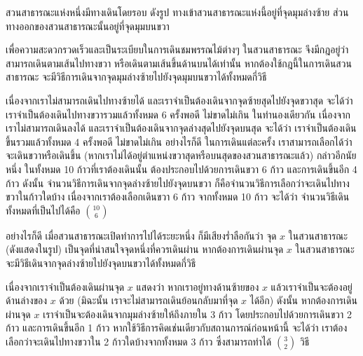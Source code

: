 \documentclass[a4paper,12pt,twoside]{article}
\begin{document}
\begin{example}
สวนสาธารณะแห่งหนึ่งมีทางเดินโดยรอบ ดังรูป \enskip ทางเข้าสวนสาธารณะแห่งนี้อยู่ที่จุดมุมล่างซ้าย ส่วนทางออกของสวนสาธารณะนั้นอยู่ที่จุดมุมบนขวา
\begin{center}
\end{center}
เพื่อความสะดวกรวดเร็วและเป็นระเบียบในการเดินชมพรรณไม้ต่างๆ ในสวนสาธารณะ จึงมีกฎอยู่ว่า สามารถเดินตามเส้นไปทางขวา หรือเดินตามเส้นขึ้นด้านบนได้เท่านั้น \enskip หากต้องใช้กฎนี้ในการเดินสวนสาธารณะ จะมีวิธีการเดินจากจุดมุมล่างซ้ายไปยังจุดมุมบนขวาได้ทั้งหมดกี่วิธี

เนื่องจากเราไม่สามารถเดินไปทางซ้ายได้ และเราจำเป็นต้องเดินจากจุดซ้ายสุดไปยังจุดขวาสุด จะได้ว่า เราจำเป็นต้องเดินไปทางขวารวมแล้วทั้งหมด 6 ครั้งพอดี ไม่ขาดไม่เกิน \enskip ในทำนองเดียวกัน เนื่องจากเราไม่สามารถเดินลงได้ และเราจำเป็นต้องเดินจากจุดล่างสุดไปยังจุดบนสุด จะได้ว่า เราจำเป็นต้องเดินขึ้นรวมแล้วทั้งหมด 4 ครั้งพอดี ไม่ขาดไม่เกิน \enskip อย่างไรก็ดี ในการเดินแต่ละครั้ง เราสามารถเลือกได้ว่าจะเดินขวาหรือเดินขึ้น (หากเราไม่ได้อยู่ตำแหน่งขวาสุดหรือบนสุดของสวนสาธารณะแล้ว) \enskip กล่าวอีกนัยหนึ่ง ในทั้งหมด 10 ก้าวที่เราต้องเดินนั้น ต้องประกอบไปด้วยการเดินขวา 6 ก้าว และการเดินขึ้นอีก 4 ก้าว \enskip ดังนั้น จำนวนวิธีการเดินจากจุดล่างซ้ายไปยังจุดบนขวา ก็คือจำนวนวิธีการเลือกว่าจะเดินไปทางขวาในก้าวใดบ้าง \enskip เนื่องจากเราต้องเลือกเดินขวา 6 ก้าว จากทั้งหมด 10 ก้าว จะได้ว่า จำนวนวิธีเดินทั้งหมดที่เป็นไปได้คือ $\binom{10}{6}$

อย่างไรก็ดี เมื่อสวนสาธารณะเปิดทำการไปได้ระยะหนึ่ง ก็มีเสียงร่ำลือกันว่า จุด $x$ ในสวนสาธารณะ (ดังแสดงในรูป) เป็นจุดที่น่าสนใจจุดหนึ่งที่ควรเดินผ่าน \enskip หากต้องการเดินผ่านจุด $x$ ในสวนสาธารณะ จะมีวิธีเดินจากจุดล่างซ้ายไปยังจุดบนขวาได้ทั้งหมดกี่วิธี

เนื่องจากเราจำเป็นต้องเดินผ่านจุด $x$ แสดงว่า หากเราอยู่ทางด้านซ้ายของ $x$ แล้วเราจำเป็นจะต้องอยู่ด้านล่างของ $x$ ด้วย (มิฉะนั้น เราจะไม่สามารถเดินย้อนกลับมาที่จุด $x$ ได้อีก) \enskip ดังนั้น หากต้องการเดินผ่านจุด $x$ เราจำเป็นจะต้องเดินจากมุมล่างซ้ายให้ถึงภายใน 3 ก้าว โดยประกอบไปด้วยการเดินขวา 2 ก้าว และการเดินขึ้นอีก 1 ก้าว \enskip หากใช้วิธีการคิดเช่นเดียวกับสถานการณ์ก่อนหน้านี้ จะได้ว่า เราต้องเลือกว่าจะเดินไปทางขวาใน 2 ก้าวใดบ้างจากทั้งหมด 3 ก้าว ซึ่งสามารถทำได้ $\binom{3}{2}$ วิธี


\end{example}
\end{document}
